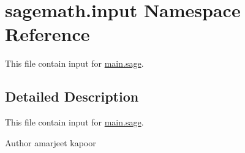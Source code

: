 \hypertarget{namespacesagemath_1_1input}{}\section{sagemath.\+input Namespace Reference}
\label{namespacesagemath_1_1input}


This file contain input for \hyperlink{main_8sage}{main.\+sage}.  




\subsection{Detailed Description}
This file contain input for \hyperlink{main_8sage}{main.\+sage}. 

\begin{DoxyAuthor}{Author}
amarjeet kapoor 
\end{DoxyAuthor}
